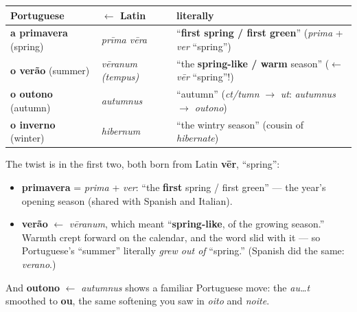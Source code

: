 \begin{cousinweb}
\noindent
\begin{tabularx}{\linewidth}{@{}>{\raggedright\arraybackslash}X>{\raggedright\arraybackslash}X>{\raggedright\arraybackslash}X@{}}
\toprule
\textbf{Portuguese} & \textbf{$\leftarrow$ Latin} & \textbf{literally} \\
\midrule
\textbf{a primavera} (spring) & \emph{prīma vēra} & \textquotedblleft{}\textbf{first spring / first green}\textquotedblright{} (\emph{prima} + \emph{ver} \textquotedblleft{}spring\textquotedblright{}) \\
\textbf{o verão} (summer) & \emph{vēranum (tempus)} & \textquotedblleft{}the \textbf{spring-like / warm} season\textquotedblright{} ($\leftarrow$ \emph{vēr} \textquotedblleft{}spring\textquotedblright{}!) \\
\textbf{o outono} (autumn) & \emph{autumnus} & \textquotedblleft{}autumn\textquotedblright{} (\emph{ct/tumn} $\to$ \emph{ut}: \emph{autumnus $\to$ outono}) \\
\textbf{o inverno} (winter) & \emph{hibernum} & \textquotedblleft{}the wintry season\textquotedblright{} (cousin of \emph{hibernate}) \\
\bottomrule
\end{tabularx}

The twist is in the first two, both born from Latin \textbf{vēr}, \textquotedblleft{}spring\textquotedblright{}:

\begin{itemize}
\raggedright
  \item \textbf{primavera} = \emph{prima} + \emph{ver}: \textquotedblleft{}the \textbf{first} spring / first green\textquotedblright{} — the year's opening season (shared with Spanish and Italian).
  \item \textbf{verão} $\leftarrow$ \emph{vēranum}, which meant \textquotedblleft{}\textbf{spring-like}, of the growing season.\textquotedblright{} Warmth crept forward on the calendar, and the word slid with it — so Portuguese's \textquotedblleft{}summer\textquotedblright{} literally \emph{grew out of} \textquotedblleft{}spring.\textquotedblright{} (Spanish did the same: \emph{verano}.)
\end{itemize}

And \textbf{outono} $\leftarrow$ \emph{autumnus} shows a familiar Portuguese move: the \emph{au…t} smoothed to \textbf{ou}, the same softening you saw in \emph{oito} and \emph{noite}.
\end{cousinweb}

